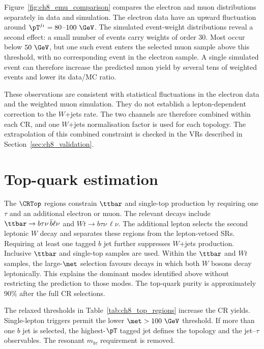 Figure~\ref{fig:ch8_emu_comparison} compares the electron and muon distributions separately in data and simulation.
The electron data have an upward fluctuation around $\pT^{j_1}=80$--$100~\GeV$.
The simulated event-weight distributions reveal a second effect: a small number of events carry weights of order 30.
Most occur below $50~\GeV$, but one such event enters the selected muon sample above this threshold, with no corresponding event in the electron sample.
A single simulated event can therefore increase the predicted muon yield by several tens of weighted events and lower its data/MC ratio.

These observations are consistent with statistical fluctuations in the electron data and the weighted muon simulation.
They do not establish a lepton-dependent correction to the $W$+jets rate.
The two channels are therefore combined within each CR, and one $W$+jets normalisation factor is used for each topology.
The extrapolation of this combined constraint is checked in the VRs described in Section~\ref{sec:ch8_validation}.


\clearpage
\section[Top-quark estimation]{Top-quark estimation}
\label{sec:ch8_top}

The $\CRTop$ regions constrain $\ttbar$ and single-top production by requiring one $\tau$ and an additional electron or muon.
The relevant decays include $\ttbar\to b\tau\nu\,\bar b\ell\nu$ and $Wt\to b\tau\nu\,\ell\nu$.
The additional lepton selects the second leptonic $W$ decay and separates these regions from the lepton-vetoed SRs.
Requiring at least one tagged $b$ jet further suppresses $W$+jets production.
Inclusive $\ttbar$ and single-top samples are used.
Within the $\ttbar$ and $Wt$ samples, the large-$\met$ selection favours decays in which both $W$ bosons decay leptonically.
This explains the dominant modes identified above without restricting the prediction to those modes.
The top-quark purity is approximately $90\%$ after the full CR selections.

The relaxed thresholds in Table~\ref{tab:ch8_top_regions} increase the CR yields.
Single-lepton triggers permit the lower $\met>100~\GeV$ threshold.
If more than one $b$ jet is selected, the highest-$\pT$ tagged jet defines the topology and the jet--$\tau$ observables.
The resonant $m_{b\tau}$ requirement is removed.


